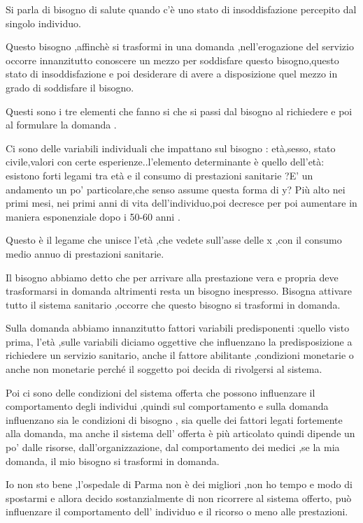 \documentclass[]{article}
\begin{document}
Si parla di bisogno di salute quando c'è uno stato di insoddisfazione
percepito dal singolo individuo.

Questo bisogno ,affinchè si trasformi in una domanda ,nell'erogazione
del servizio occorre innanzitutto conoscere un mezzo per soddisfare
questo bisogno,questo stato di insoddisfazione e poi desiderare di avere
a disposizione quel mezzo in grado di soddisfare il bisogno.

Questi sono i tre elementi che fanno si che si passi dal bisogno al
richiedere e poi al formulare la domanda .

Ci sono delle variabili individuali che impattano sul bisogno :
età,sesso, stato civile,valori con certe esperienze..l'elemento
determinante è quello dell'età: esistono forti legami tra età e il
consumo di prestazioni sanitarie ?E' un andamento un po' particolare,che
senso assume questa forma di y? Più alto nei primi mesi, nei primi anni
di vita dell'individuo,poi decresce per poi aumentare in maniera
esponenziale dopo i 50-60 anni .

Questo è il legame che unisce l'età ,che vedete sull'asse delle x ,con
il consumo medio annuo di prestazioni sanitarie.

Il bisogno abbiamo detto che per arrivare alla prestazione vera e
propria deve trasformarsi in domanda altrimenti resta un bisogno
inespresso. Bisogna attivare tutto il sistema sanitario ,occorre che
questo bisogno si trasformi in domanda.

Sulla domanda abbiamo innanzitutto fattori variabili predisponenti
:quello visto prima, l'età ,sulle variabili diciamo oggettive che
influenzano la predisposizione a richiedere un servizio sanitario, anche
il fattore abilitante ,condizioni monetarie o anche non monetarie perché
il soggetto poi decida di rivolgersi al sistema.

Poi ci sono delle condizioni del sistema offerta che possono influenzare
il comportamento degli individui ,quindi sul comportamento e sulla
domanda influenzano sia le condizioni di bisogno , sia quelle dei
fattori legati fortemente alla domanda, ma anche il sistema dell'
offerta è più articolato quindi dipende un po' dalle risorse,
dall'organizzazione, dal comportamento dei medici ,se la mia domanda, il
mio bisogno si trasformi in domanda.

Io non sto bene ,l'ospedale di Parma non è dei migliori ,non ho tempo e
modo di spostarmi e allora decido sostanzialmente di non ricorrere al
sistema offerto, può influenzare il comportamento dell' individuo e il
ricorso o meno alle prestazioni.
\end{document}
